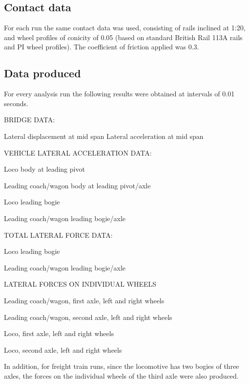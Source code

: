 \begin{appendices}
\subsection{Contact data}
For each run the same contact data was used, consisting of rails inclined at 1:20, and wheel profiles of conicity of 0.05 (based on standard British Rail 113A rails and PI wheel profiles). The coefficient of friction applied was 0.3.


\subsection{Data produced}

For every analysis run the following results were obtained at intervals of 0.01 seconds.

BRIDGE DATA:

Lateral displacement at mid span Lateral acceleration at mid span

\vspace*{\baselineskip}

VEHICLE LATERAL ACCELERATION DATA:

Loco body at leading pivot

Leading coach/wagon body at leading pivot/axle 

Loco leading bogie

Leading coach/wagon leading bogie/axle

\vspace*{\baselineskip}

TOTAL LATERAL FORCE DATA:

Loco leading bogie

Leading coach/wagon leading bogie/axle

\vspace*{\baselineskip}

LATERAL FORCES ON INDIVIDUAL WHEELS

Leading coach/wagon, first axle, left and right wheels 

Leading coach/wagon, second axle, left and right wheels 

Loco, first axle, left and right wheels

Loco, second axle, left and right wheels

\vspace*{\baselineskip}

In addition, for freight train runs, since the locomotive has two bogies of three axles, the forces on the individual wheels of the third axle were also produced.


\end{appendices}
